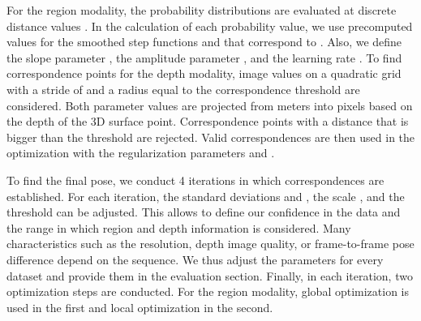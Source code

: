 \documentclass[10pt,twocolumn,letterpaper]{article}
\begin{document}
For the region modality, the probability distributions  are evaluated at  discrete distance values .
In the calculation of each probability value, we use  precomputed values for the smoothed step functions  and  that correspond to .
Also, we define the slope parameter , the amplitude parameter , and the learning rate .
To find correspondence points for the depth modality, image values on a quadratic grid with a stride of  and a radius equal to the correspondence threshold  are considered.
Both parameter values are projected from meters into pixels based on the depth of the 3D surface point.
Correspondence points with a distance that is bigger than the threshold  are rejected.
Valid correspondences are then used in the optimization with the regularization parameters  and .

To find the final pose, we conduct 4 iterations in which correspondences are established.
For each iteration, the standard deviations  and , the scale , and the threshold  can be adjusted.
This allows to define our confidence in the data and the range in which region and depth information is considered.
Many characteristics such as the resolution, depth image quality, or frame-to-frame pose difference depend on the sequence.
We thus adjust the parameters for every dataset and provide them in the evaluation section.
Finally, in each iteration, two optimization steps are conducted.
For the region modality, global optimization is used in the first and local optimization in the second.
\end{document}
